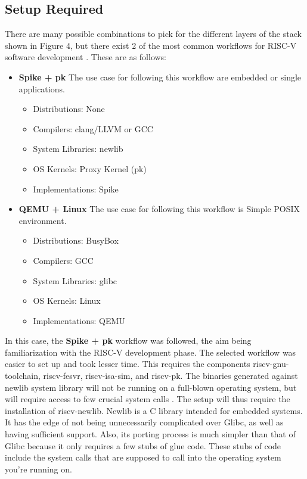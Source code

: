 \subsection{Setup Required}
 \label{sect6_2_2}
There are many possible combinations to pick for the different layers of the stack shown in Figure 4, but there exist 2 of the most common workflows for RISC-V software development \cite{riscv_tools_bootcamp}. These are as follows:
\begin{itemize}
\item \textbf{Spike + pk} \newline
The use case for following this workflow are embedded or single applications.
\begin{itemize}
\item Distributions: None
\item Compilers: clang/LLVM or GCC
\item System Libraries: newlib
\item OS Kernels: Proxy Kernel (pk)
\item Implementations: Spike
\end{itemize}	
	
\item \textbf{QEMU + Linux} \newline
The use case for following this workflow is Simple POSIX environment.
\begin{itemize}
\item Distributions: BusyBox
\item Compilers: GCC
\item System Libraries: glibc
\item OS Kernels: Linux
\item Implementations: QEMU
\end{itemize}
\end{itemize}
In this case, the \textbf{Spike + pk} workflow was followed, the aim being familiarization with the RISC-V development phase. The selected workflow was easier to set up and took lesser time. This requires the components riscv-gnu-toolchain, riscv-fesvr, riscv-isa-sim, and riscv-pk. \newline\newline
The binaries generated against newlib system library will not be running on a full-blown operating system, but will require access to few crucial system calls \cite{riscv_soft_tools}. The setup will thus require the installation of riscv-newlib. Newlib is a C library intended for embedded systems. It has the edge of not being unnecessarily complicated over Glibc, as well as having sufficient support. Also, its porting process is much simpler than that of Glibc because it only requires a few stubs of glue code. These stubs of code include the system calls that are supposed to call into the operating system you're running on.

